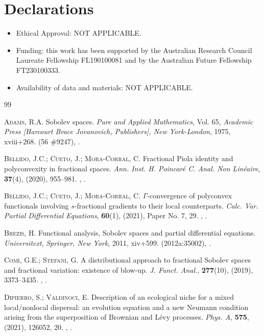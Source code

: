 \documentclass[11pt,hyp,]{nyjm}
\numberwithin{equation}{section}
\theoremstyle{remark}
\begin{document}
\section*{Declarations}

\begin{itemize}
\item Ethical Approval: NOT APPLICABLE.
\item Funding: this work has been supported by the Australian Research Council Laureate Fellowship FL190100081 and
by the Australian Future Fellowship FT230100333.
\item Availability of data and materials: NOT APPLICABLE. 
\end{itemize}

\begin{thebibliography}{99}

 {\scshape Adams, R.A.} Sobolev spaces. {\em Pure and Applied Mathematics}, Vol. 65, {\em Academic Press [Harcourt Brace Jovanovich, Publishers], New York-London}, 1975, xviii+268. (56 \#9247), .

 {\scshape Bellido, J.C.; Cueto, J.; Mora-Corral, C.} Fractional Piola identity and polyconvexity in fractional spaces. {\em Ann. Inst. H. Poincar\'e C. Anal. Non Lin\'eaire}, {\bf 37}(4), (2020), 955--981.  , .

 {\scshape Bellido, J.C.; Cueto, J.; Mora-Corral, C.} $\Gamma$-convergence of polyconvex functionals involving $s$-fractional gradients to their local counterparts. {\em Calc. Var. Partial Differential Equations}, {\bf 60}(1), (2021), Paper No. 7, 29. , .

 {\scshape Brezis, H.} Functional analysis, Sobolev spaces and partial differential equations. {\em Universitext}, {\em Springer, New York}, 2011, xiv+599.  (2012a:35002), .

 {\scshape Comi, G.E.; Stefani, G.} A distributional approach to fractional Sobolev spaces and fractional variation: existence of blow-up. {\em J. Funct. Anal.}, {\bf 277}(10), (2019), 3373--3435.  , .

 {\scshape Dipierro, S.; Valdinoci, E.} Description of an ecological niche for a mixed local/nonlocal dispersal: an evolution equation and a new Neumann condition arising from the superposition of Brownian and L\'evy processes. {\em Phys. A}, {\bf 575}, (2021), 126052, 20.  , .


\end{thebibliography}
\end{document}
